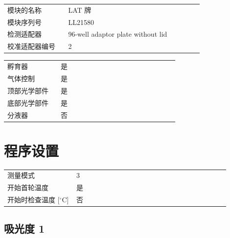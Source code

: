 \documentclass[UTF8,10pt,a4paper,fontset=fandol]{ctexart}
\newcommand{\fieldvalue}[1]{#1}
\begin{document}
\begin{tabular}{@{}p{0.28\linewidth}p{0.62\linewidth}@{}}
模块的名称 &
\fieldvalue{LAT 牌}\\
模块序列号 &
\fieldvalue{LL21580}\\
检测适配器 &
\fieldvalue{96-well adaptor plate without lid}\\
校准适配器编号 &
\fieldvalue{2}\\
\end{tabular}

\begin{tabular}{@{}p{0.28\linewidth}p{0.62\linewidth}@{}}
孵育器 &
\fieldvalue{是}\\
气体控制 &
\fieldvalue{是}\\
顶部光学部件 &
\fieldvalue{是}\\
底部光学部件 &
\fieldvalue{是}\\
分液器 &
\fieldvalue{否}\\
\end{tabular}

\section*{程序设置}

\begin{tabular}{@{}p{0.28\linewidth}p{0.62\linewidth}@{}}
测量模式 &
\fieldvalue{3}\\
开始首轮温度 &
\fieldvalue{是}\\
开始时检查温度 [$^\circ$C] &
\fieldvalue{否}\\
\end{tabular}

\subsection*{吸光度 1}
\end{document}

